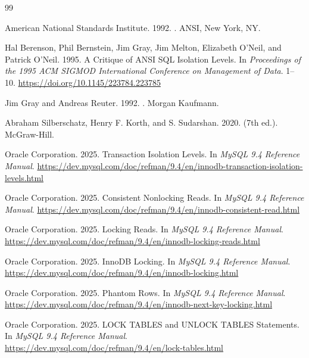 \documentclass[sigconf, pbalance, nonacm]{acmart}
\begin{document}
\begin{thebibliography}{99}

American National Standards Institute. 1992.
.
\newblock ANSI, New York, NY.

Hal Berenson, Phil Bernstein, Jim Gray, Jim Melton, Elizabeth O'Neil, and Patrick O'Neil. 1995.
\newblock A Critique of ANSI SQL Isolation Levels.
\newblock In {\em Proceedings of the 1995 ACM SIGMOD International Conference on Management of Data}. 1--10.
\newblock \url{https://doi.org/10.1145/223784.223785}

Jim Gray and Andreas Reuter. 1992.
.
\newblock Morgan Kaufmann.

Abraham Silberschatz, Henry F. Korth, and S. Sudarshan. 2020.
 (7th ed.).
\newblock McGraw-Hill.

Oracle Corporation. 2025.
\newblock Transaction Isolation Levels. In {\em MySQL 9.4 Reference Manual}.
\newblock \url{https://dev.mysql.com/doc/refman/9.4/en/innodb-transaction-isolation-levels.html}

Oracle Corporation. 2025.
\newblock Consistent Nonlocking Reads. In {\em MySQL 9.4 Reference Manual}.
\newblock \url{https://dev.mysql.com/doc/refman/9.4/en/innodb-consistent-read.html}

Oracle Corporation. 2025.
\newblock Locking Reads. In {\em MySQL 9.4 Reference Manual}.
\newblock \url{https://dev.mysql.com/doc/refman/9.4/en/innodb-locking-reads.html}

Oracle Corporation. 2025.
\newblock InnoDB Locking. In {\em MySQL 9.4 Reference Manual}.
\newblock \url{https://dev.mysql.com/doc/refman/9.4/en/innodb-locking.html}

Oracle Corporation. 2025.
\newblock Phantom Rows. In {\em MySQL 9.4 Reference Manual}.
\newblock \url{https://dev.mysql.com/doc/refman/9.4/en/innodb-next-key-locking.html}

Oracle Corporation. 2025.
\newblock LOCK TABLES and UNLOCK TABLES Statements. In {\em MySQL 9.4 Reference Manual}.
\newblock \url{https://dev.mysql.com/doc/refman/9.4/en/lock-tables.html}


\end{thebibliography}
\end{document}
